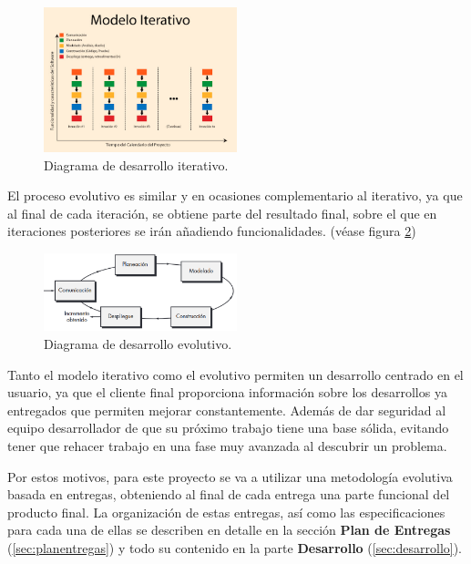 \begin{figure}
	\centering
	\includegraphics[width=0.5\textwidth]{03.EstudioProblema/04.MetodologiaAUsar/00.Figuras/01.modelo_iterativo.jpg}
	\caption{Diagrama de desarrollo iterativo. \cite{MU_img_modeloiterativo}}
	\label{fig:MU_modeloiterativo}
\end{figure}


El proceso evolutivo es similar y en ocasiones complementario al iterativo, ya que al final de cada iteración, se obtiene parte del resultado final, sobre el que en iteraciones posteriores se irán añadiendo funcionalidades. (véase figura \ref{fig:MU_modeloevolutivo})


\begin{figure}
	\centering
	\includegraphics[width=0.5\textwidth]{03.EstudioProblema/04.MetodologiaAUsar/00.Figuras/02.modelo_evolutivo.png}
	\caption{Diagrama de desarrollo evolutivo. \cite{MU_img_modeloevolutivo}}
	\label{fig:MU_modeloevolutivo}
\end{figure}

 
Tanto el modelo iterativo como el evolutivo permiten un desarrollo centrado en el usuario, ya que el cliente final proporciona información sobre los desarrollos ya entregados que permiten mejorar constantemente. Además de dar seguridad al equipo desarrollador de que su próximo trabajo tiene una base sólida, evitando tener que rehacer trabajo en una fase muy avanzada al descubrir un problema.

Por estos motivos, para este proyecto se va a utilizar una metodología evolutiva basada en entregas, obteniendo al final de cada entrega una parte funcional del producto final. La organización de estas entregas, así como las especificaciones para cada una de ellas se describen en detalle en la sección \textbf{Plan de Entregas} (\ref{sec:planentregas}) y todo su contenido en la parte \textbf{Desarrollo} (\ref{sec:desarrollo}).

